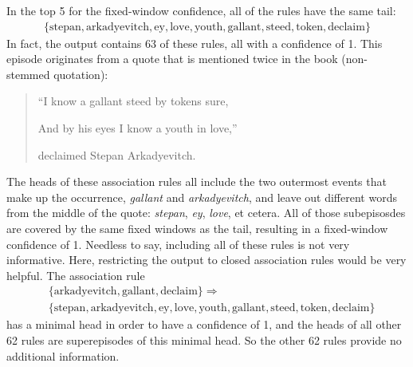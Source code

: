 In the top 5 for the fixed-window confidence, all of the rules have the same tail:
\begin{align*}
\{ \text{stepan},\allowbreak\text{arkadyevitch},\allowbreak\text{ey},\allowbreak\text{love},\allowbreak\text{youth},\allowbreak\text{gallant},\allowbreak\text{steed},\allowbreak\text{token},\allowbreak\text{declaim} \}
\end{align*}
In fact, the output contains 63 of these rules, all with a confidence of 1. This episode originates from a quote that is mentioned twice in the book (non-stemmed quotation):
\begin{quotation}
``I know a gallant steed by tokens sure,

And by his eyes I know a youth in love,''

declaimed Stepan Arkadyevitch.
\end{quotation}
The heads of these association rules all include the two outermost events that make up the occurrence, \emph{gallant} and \emph{arkadyevitch}, and leave out different words from the middle of the quote: \emph{stepan}, \emph{ey}, \emph{love}, et cetera. All of those subepisosdes are covered by the same fixed windows as the tail, resulting in a fixed-window confidence of 1. Needless to say, including all of these rules is not very informative. Here, restricting the output to closed association rules would be very helpful. The association rule
\begin{align*}
& \{ \text{arkadyevitch},\allowbreak\text{gallant},\allowbreak\text{declaim} \} \Rightarrow \\
& \{ \text{stepan},\allowbreak\text{arkadyevitch},\allowbreak\text{ey},\allowbreak\text{love},\allowbreak\text{youth},\allowbreak\text{gallant},\allowbreak\text{steed},\allowbreak\text{token},\allowbreak\text{declaim} \}
\end{align*}
has a minimal head in order to have a confidence of 1, and the heads of all other 62 rules are superepisodes of this minimal head. So the other 62 rules provide no additional information.

